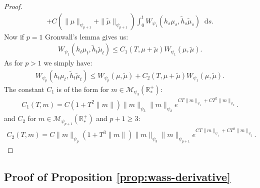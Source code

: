 \documentclass[11pt,a4paper]{article}
\newcommand{\RRP}{\mathbb{R}^+_*}
\newcommand{\MC}{\mathcal{M}}
\newcommand{\dd}{\mathop{}\!\mathrm{d}}
\begin{document}
\begin{proof}
\begin{multline*}
         + C\left(\|\mu\|_{\psi_{p+1}}+ \|\tilde{\mu}\|_{\psi_{p+1}} \right)\int_0^t W_{\psi_1}(h_s\mu_s, \tilde{h}_s \tilde{\mu}_s) \dd s.
    \end{multline*}
    Now if $p = 1$ Gronwall's lemma gives us:
    \begin{align*}
        W_{\psi_1} \left(h_t\mu_t ,\tilde{h}_t\tilde{\mu}_t\right) \leq  C_1(T,\mu + \tilde{\mu})W_{\psi_1}(\mu,\tilde{\mu}).
    \end{align*}
    As for $p > 1$ we simply have:
    \begin{align*}
        W_{\psi_p} \left(h_t\mu_t ,\tilde{h}_t\tilde{\mu}_t\right) \leq W_{\psi_p}(\mu,\tilde{\mu}) + C_2(T,\mu + \tilde{\mu})W_{\psi_1}(\mu,\tilde{\mu}).
    \end{align*}
    The constant $C_1$ is of the form for $m \in \MC_{\psi_3}(\RRP)$:
    \begin{align*}
        C_1(T,m) = C\left( 1 + T^2\|m\|\right)\|m\|_{\psi_3} \|m\|_{\psi_{2}}e^{CT \|m\|_{\psi_1} + CT^2\|m\|_{\psi_2}}.
    \end{align*}
    and $C_2$ for $m \in \MC_{\psi_{p+1}}(\RRP)$ and $p+1 \geq 3$:
    \begin{align*}
        C_2(T,m) = C\|m\|_{\psi_p}\left( 1 + T^3\|m\|\right)\|m\|_{\psi_3} \|m\|_{\psi_{p+1}}e^{CT \|m\|_{\psi_1} + CT^2\|m\|_{\psi_2}}.
    \end{align*}
\end{proof}
\subsection{Proof of Proposition \ref{prop:wass-derivative}}
\end{document}
